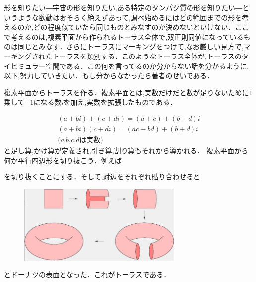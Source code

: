 


形を知りたい―宇宙の形を知りたい,ある特定のタンパク質の形を知りたい―というような欲動はおそらく絶えずあって,調べ始めるにはどの範囲までの形を考えるのか,どの程度似ていたら同じものとみなすのか決めないといけない．ここで考えるのは,複素平面から作られるトーラス全体で,双正則同値になっているものは同じとみなす．さらにトーラスにマーキングをつけて,なお厳しい見方で,マーキングされたトーラスを類別する．このようなトーラス全体が,トーラスのタイヒミュラー空間である．この何を言ってるのか分からない話を分かるように,以下,努力していきたい．もし分からなかったら著者のせいである．

複素平面からトーラスを作る．複素平面とは,実数だけだと数が足りないために$1$乗して$-1$になる数$i$を加え,実数を拡張したものである．


\begin{gather*}
(a+bi)+(c+di)=(a+c)+(b+d)i \\
(a+bi)(c+di)=(ac-bd)+(b+d)i \\
\text{($a$,$b$,$c$,$d$は実数)}
\end{gather*}
と足し算,かけ算が定義され,引き算,割り算もそれから導かれる．
複素平面から何か平行四辺形を切り抜こう．例えば\\

を切り抜くことにする．そして,対辺をそれぞれ貼り合わせると
\\
\begin{figure}[h]
\includegraphics[width=8cm]{asaka3.png}
\end{figure}
とドーナツの表面となった．これがトーラスである．

